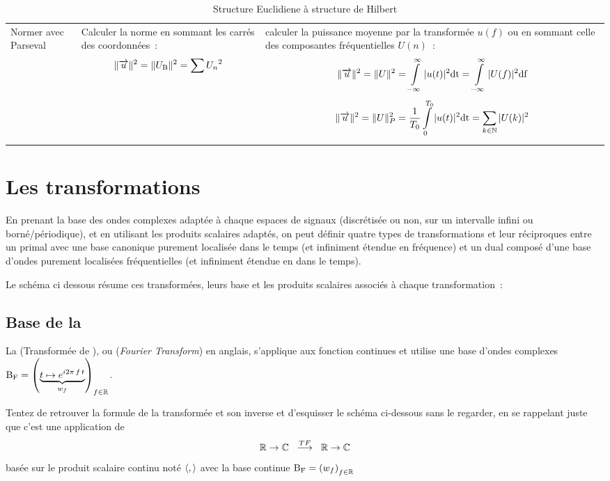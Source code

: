 \begin{table}[h!]
\begin{tabular}{p{}|p{}|p{}}
  Normer avec Parseval  &  Calculer la norme en sommant les carrés des coordonnées~: $$\|\overrightarrow{u}\|^2=\|U_{\mathrm{B}}\|^2=\sum {U_n}^2$$ &  calculer la puissance moyenne par la transformée $u(f)$ ou en sommant celle des composantes fréquentielles $U(n)$~: $$\|\overrightarrow{u}\|^2=\|U\|^2=\int\limits_{-\infty}^{\infty}{|u(t)|^2\mathrm{d{t}}}=\int\limits_{-\infty}^{\infty}{|U(f)|^2\mathrm{d{f}}} $$  $$\|\overrightarrow{u}\|^2=\|U\|_P^2=\frac{1}{T_0}\int\limits_{0}^{T_0}{|u(t)|^2\mathrm{d{t}}}=\sum\limits_{k\in\mathbb{N}}{|U(k)|^2} $$
\end{tabular}

\caption{Structure Euclidiene à structure de Hilbert}
\label{tab:hilbert}
\end{table}

\section{Les transformations}

En prenant la base des ondes complexes adaptée à chaque espaces de
signaux (discrétisée ou non, sur un intervalle infini ou
borné/périodique), et en utilisant les produits scalaires adaptés, on
peut définir quatre types de transformations et leur réciproques entre
un primal avec une base canonique purement localisée dans le temps (et
infiniment étendue en fréquence) et un dual composé d'une base d'ondes
purement localisées fréquentielles (et infiniment étendue en dans le
temps).

Le schéma ci dessous résume ces transformées, leurs base et les
produits scalaires associés à chaque transformation~:



\subsection{Base de la \TF{}}

La \TF{} (Transformée de \Fourier), ou \FT{} (\emph{Fourier
  Transform}) en anglais, s'applique aux fonction continues et utilise
une base d'ondes complexes
$\mathrm{B_F}=\left(\underbrace{t\mapsto e^{i2\pi\,f\,t}}_{w_f}\right)_{f\in\mathbb{R}}$.

\begin{exercice}
Tentez de retrouver la formule de la transformée et son inverse et d'esquisser le schéma ci-dessous sans le regarder, en se rappelant juste que c'est une application de $$\mathbb{R}\rightarrow\mathbb{C}\;\;\overset{TF}{\longrightarrow}\;\;\mathbb{R}\rightarrow\mathbb{C}$$ basée sur le produit scalaire continu noté $\langle,\rangle$ avec la base continue $\mathrm{B_F}=\left(w_f\right)_{f\in\mathbb{R}}$
\end{exercice}

